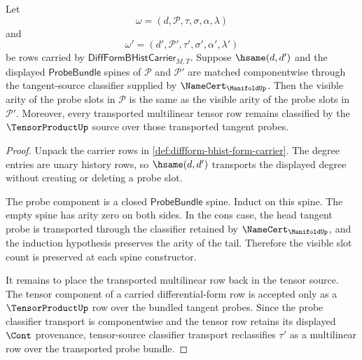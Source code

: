\begin{theorem}
\label{thm:diffform-probe-slot-arity-transport}
Let
$$
\omega=(d,\mathcal{P},\tau,\sigma,\alpha,\lambda)
$$
and
$$
\omega'=(d',\mathcal{P}',\tau',\sigma',\alpha',\lambda')
$$
be rows carried by $\mathsf{DiffFormBHistCarrier}_{M,T}$. Suppose
$\hsame(d,d')$ and the displayed $\mathsf{ProbeBundle}$ spines of
$\mathcal{P}$ and $\mathcal{P}'$ are matched componentwise through the
tangent-source classifier supplied by $\NameCert_{\ManifoldUp}$. Then the
visible arity of the probe slots in $\mathcal{P}$ is the same as the visible
arity of the probe slots in $\mathcal{P}'$. Moreover, every transported
multilinear tensor row remains classified by the $\TensorProductUp$ source
over those transported tangent probes.
\end{theorem}
\begin{proof}
Unpack the carrier rows in
\autoref{def:diffform-bhist-form-carrier}. The degree entries are unary
history rows, so $\hsame(d,d')$ transports the displayed degree without
creating or deleting a probe slot.

The probe component is a closed $\mathsf{ProbeBundle}$ spine. Induct on this
spine. The empty spine has arity zero on both sides. In the cons case, the
head tangent probe is transported through the classifier retained by
$\NameCert_{\ManifoldUp}$, and the induction hypothesis preserves the arity of
the tail. Therefore the visible slot count is preserved at each spine
constructor.

It remains to place the transported multilinear row back in the tensor source.
The tensor component of a carried differential-form row is accepted only as a
$\TensorProductUp$ row over the bundled tangent probes. Since the probe
classifier transport is componentwise and the tensor row retains its displayed
$\Cont$ provenance, tensor-source classifier transport reclassifies $\tau'$ as
a multilinear row over the transported probe bundle.
\end{proof}

